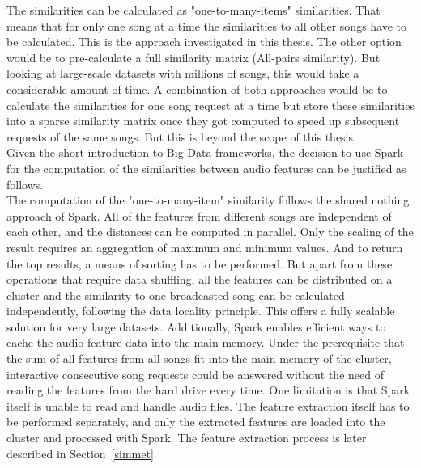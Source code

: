 The similarities can be calculated as "one-to-many-items" similarities. That means that for only one song at a time the similarities to all other songs have to be calculated. This is the approach investigated in this thesis. The other option would be to pre-calculate a full similarity matrix (All-pairs similarity). But looking at large-scale datasets with millions of songs, this would take a considerable amount of time. A combination of both approaches would be to calculate the similarities for one song request at a time but store these similarities into a sparse similarity matrix once they got computed to speed up subsequent requests of the same songs. But this is beyond the scope of this thesis.\\ 
Given the short introduction to Big Data frameworks, the decision to use Spark for the computation of the similarities between audio features can be justified as follows.\\
The computation of the "one-to-many-item" similarity follows the shared nothing approach of Spark. All of the features from different songs are independent of each other, and the distances can be computed in parallel. Only the scaling of the result requires an aggregation of maximum and minimum values. And to return the top results, a means of sorting has to be performed. But apart from these operations that require data shuffling, all the features can be distributed on a cluster and the similarity to one broadcasted song can be calculated independently, following the data locality principle. This offers a fully scalable solution for very large datasets. Additionally, Spark enables efficient ways to cache the audio feature data into the main memory. Under the prerequisite that the sum of all features from all songs fit into the main memory of the cluster, interactive consecutive song requests could be answered without the need of reading the features from the hard drive every time.
One limitation is that Spark itself is unable to read and handle audio files. The feature extraction itself has to be performed separately, and only the extracted features are loaded into the cluster and processed with Spark. The feature extraction process is later described in Section~\ref{simmet}.\\


